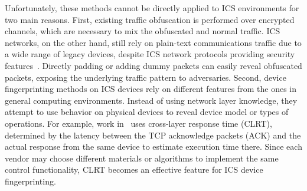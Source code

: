 \documentclass[conference]{IEEEtran}
\begin{document}
Unfortunately, these methods cannot be directly applied to ICS environments for two main reasons. 
First, existing traffic obfuscation is performed over encrypted channels, which are necessary to mix the obfuscated and normal traffic. ICS networks, on the other hand, still rely on plain-text communications traffic due to a wide range of legacy devices, despite ICS network protocols providing security features~\cite{dnp3std}. Directly padding or adding dummy packets can easily reveal obfuscated packets, exposing the underlying traffic pattern to adversaries. 
Second, device fingerprinting methods on ICS devices rely on different features from the ones in general computing environments. Instead of using network layer knowledge, they attempt to use behavior on physical devices to reveal device model or types of operations. For example, work in~\cite{formby2016} uses cross-layer response time (CLRT), determined by the latency between the TCP acknowledge packets (ACK) and the actual response from the same device to estimate execution time there. Since each vendor may choose different materials or algorithms to implement the same control functionality, CLRT becomes an effective feature for ICS device fingerprinting. 

\end{document}

